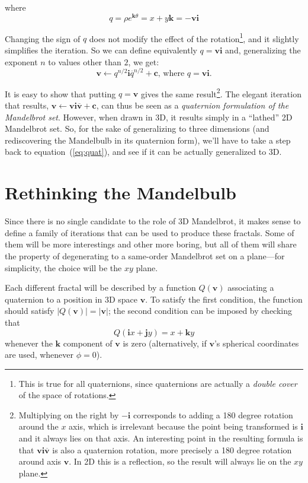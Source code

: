 \documentclass{article}
\let\vec\mathbf
\let\bar\overline
\newcommand{\where}{\text{, where }}
\begin{document}
\noindent
where
\begin{equation*}
q = \rho e^{\vec{k}\theta} = x + y\vec{k} = -\vec{v}\vec{i}
\end{equation*}

\noindent
Changing the sign of $q$ does not modify the effect of the
rotation\footnote{This is true for all quaternions, since quaternions
  are actually a \emph{double cover} of the space of rotations.}, and
it slightly simplifies the iteration.  So we can define equivalently
$q=\vec{v}\vec{i}$ and, generalizing the exponent $n$ to values other
than $2$, we get:
\begin{equation}
\label{eq:quat}
\vec{v}\leftarrow q^{n/2} \vec{i} \bar q^{n/2}+\vec{c} \where q=\vec{v}\vec{i}.
\end{equation}

\noindent
It is easy to show that putting $q=\vec{v}$ gives the same
result\footnote{Multiplying on the right by $\vec{-i}$ corresponds to
  adding a 180 degree rotation around the $x$ axis, which is
  irrelevant because the point being transformed is $\vec{i}$ and it
  always lies on that axis.  An interesting point in the resulting formula
  is that $\vec{v}\vec{i}\vec{\bar v}$ is also a quaternion rotation,
  more precisely a 180 degree rotation around axis $\vec{v}$.  In 2D
  this is a reflection, so the result will always lie on the $xy$ plane.}.
The elegant iteration that results, $\vec{v}\leftarrow\vec{v} \vec{i}
\vec{\bar v}+\vec{c}$, can thus be seen as a \emph{quaternion formulation
of the Mandelbrot set}.  However, when drawn in 3D, it results simply in a
``lathed'' 2D Mandelbrot set.  So, for the sake of generalizing to three
dimensions (and rediscovering the Mandelbulb in its quaternion form),
we'll have to take a step back to equation~(\ref{eq:quat}), and see if
it can be actually generalized to 3D.

\section{Rethinking the Mandelbulb}
\label{sec:quatbulb}

Since there is no single candidate to the role of 3D Mandelbrot, it
makes sense to define a family of iterations that can be used to
produce these fractals.  Some of them will be more interestings and
other more boring, but all of them will share the property of
degenerating to a same-order Mandelbrot set on a plane---for
simplicity, the choice will be the $xy$ plane.

Each different fractal will be described by a function $Q(\vec{v})$
associating a quaternion to a position in 3D space $\vec{v}$.  To
satisfy the first condition, the function should satisfy
$|Q(\vec{v})| = |\vec{v}|$; the second condition can be imposed
by checking that
\begin{equation*}
\label{eq:its-mandel}
 Q(\vec{i}x+\vec{j}y) = x+\vec{k}y
\end{equation*}
\noindent
whenever the $\vec{k}$ component of $\vec{v}$ is zero (alternatively,
if $\vec{v}$'s spherical coordinates are used, whenever $\phi = 0$).
\end{document}
